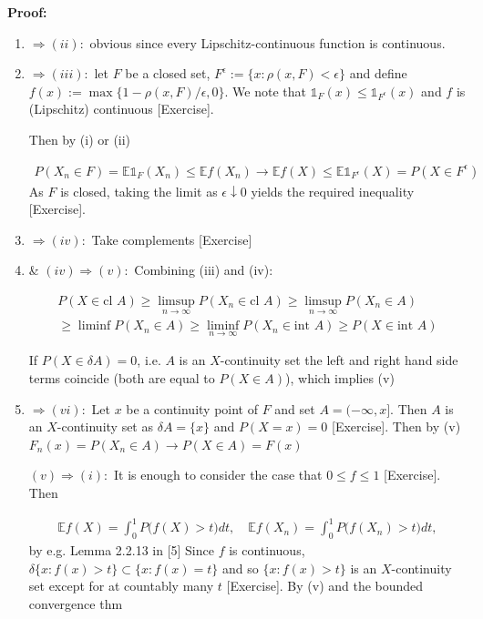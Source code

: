 \documentclass[10pt]{article}
\begin{document}
\textbf{Proof: }

\begin{enumerate}[label=\textit{(\roman*)}]
    \item $ \Longrightarrow (ii):$ obvious since every Lipschitz-continuous function is continuous.
    \item $ \Longrightarrow (iii): $ let $F$ be a closed set, $F^\epsilon := \{x : \rho(x, F) < \epsilon\}$ and define $f(x) := \max\{1 - \rho(x, F) / \epsilon, 0\}$. We note that $\mathbb{1}_F(x) \leq \mathbb{1}_{F^\epsilon}(x)$ and $f$ is (Lipschitz) continuous [Exercise].
    
    Then by (i) or (ii)

    \begin{gather*}
        P(X_n \in F) = \mathbb{E}\mathbb{1}_F(X_n) \leq \mathbb{E}f(X_n) \to \mathbb{E}f(X) \leq \mathbb{E}\mathbb{1}_{F^\epsilon}(X) = P(X \in F^\epsilon)
    \end{gather*}
    As $F$ is closed, taking the limit as $\epsilon \downarrow 0$ yields the required inequality [Exercise].

    \item $\Longrightarrow (iv): $ Take complements [Exercise]

    \item \& $(iv)\Longrightarrow (v):$ Combining (iii) and (iv):

    \begin{gather*}
        P(X \in \text{cl }A) \geq \limsup_{n \to \infty}P(X_n \in \text{cl }A) \geq \limsup_{n \to \infty}P(X_n \in A) \\
        \geq \liminf P(X_n \in A) \geq \liminf_{n \to \infty}P(X_n \in \text{int }A) \geq P(X \in \text{int }A)
    \end{gather*}

    If $P(X \in \delta A) = 0$, i.e. $A$ is an $X$-continuity set the left and right hand side terms coincide (both are equal to $P(X \in A)$), which implies (v)

    \item $\Longrightarrow (vi):$ Let $x$ be a continuity point of $F$ and set $A = (-\infty, x]$. Then $A$ is an $X$-continuity set as $\delta A = \{x\}$ and $P(X = x) = 0$ [Exercise]. Then by (v) $F_n(x) = P(X_n \in A) \to P(X \in A) = F(x)$

    $(v) \Longrightarrow (i):$ It is enough to consider the case that $0 \leq f \leq 1$ [Exercise]. Then 

    \begin{gather*}
        \mathbb{E}f(X) = \int_{0}^{1}P\big(f(X) > t\big) dt, \quad \mathbb{E}f(X_n) = \int_{0}^{1}P\big(f(X_n) > t\big) dt,
    \end{gather*}
    by e.g. Lemma 2.2.13 in [5] Since $f$ is continuous, $\delta\{x : f(x) > t\} \subset \{x : f(x) = t\}$ and so $\{x : f(x) > t\}$ is an $X$-continuity set except for at countably many $t$ [Exercise]. By (v) and the bounded convergence thm 


\end{enumerate}
\end{document}
